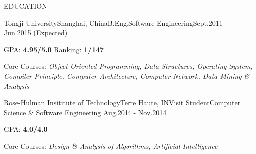 \documentclass{resume} %
\begin{document}

\begin{rSection}{EDUCATION}

  \begin{eSubsection}{Tongji University}{Shanghai, China}{B.Eng.}{Software Engineering}{Sept.2011 - Jun.2015
    (Expected)}
  \item GPA: {\bf 4.95/5.0} \space\space Ranking: {\bf 1/147}
  \item Core Courses: {\em Object-Oriented Programming, Data Structures, Operating System, Compiler Principle, Computer Architecture, Computer Network, Data Mining \& Analysis}
  \end{eSubsection}

  \begin{eSubsection}{Rose-Hulman Insititute of Technology}{Terre Haute, IN}{Visit Student}{Computer
    Science \& Software Engineering}{ Aug.2014 - Nov.2014}
  \item GPA: {\bf 4.0/4.0}
  \item Core Courses: {\em Design \& Analysis of Algorithms, Artificial Intelligence}
  \end{eSubsection}

\end{rSection}

\end{document}
